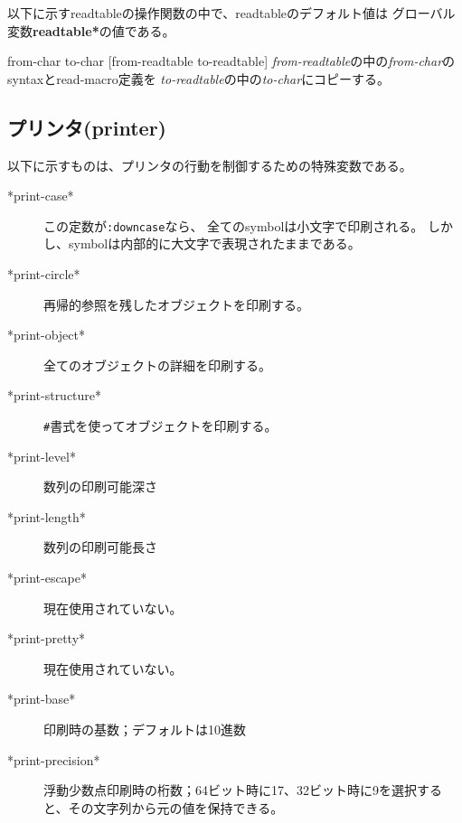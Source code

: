 以下に示すreadtableの操作関数の中で、readtableのデフォルト値は
グローバル変数{\bf *readtable*}の値である。

\begin{refdesc}


{from-char to-char [from-readtable to-readtable]}
{{\em from-readtable}の中の{\em from-char}のsyntaxとread-macro定義を
{\em to-readtable}の中の{\em to-char}にコピーする。}

\end{refdesc}

%
%

\newpage

\subsection{プリンタ(printer)}

以下に示すものは、プリンタの行動を制御するための特殊変数である。

\begin{description}

\item[*print-case*] この定数が{\tt :downcase}なら、
全てのsymbolは小文字で印刷される。
しかし、symbolは内部的に大文字で表現されたままである。
\item[*print-circle*] 再帰的参照を残したオブジェクトを印刷する。
\item[*print-object*] 全てのオブジェクトの詳細を印刷する。
\item[*print-structure*] {\tt \#}書式を使ってオブジェクトを印刷する。
\item[*print-level*] 数列の印刷可能深さ
\item[*print-length*] 数列の印刷可能長さ
\item[*print-escape*] 現在使用されていない。
\item[*print-pretty*] 現在使用されていない。
\item[*print-base*] 印刷時の基数；デフォルトは10進数
\item[*print-precision*] 浮動少数点印刷時の桁数；64ビット時に17、32ビット時に9を選択すると、その文字列から元の値を保持できる。
\end{description}

